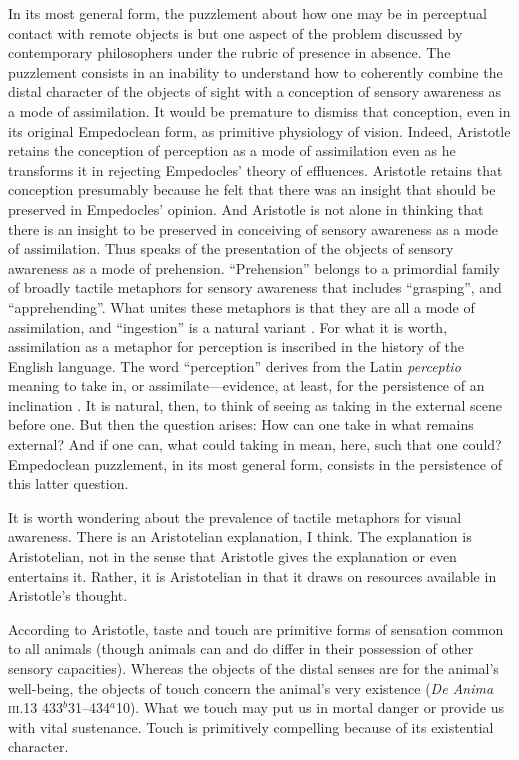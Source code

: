 In its most general form, the puzzlement about how one may be in perceptual contact with remote objects is but one aspect of the problem discussed by contemporary philosophers under the rubric of presence in absence. The puzzlement consists in an inability to understand how to coherently combine the distal character of the objects of sight with a conception of sensory awareness as a mode of assimilation. It would be premature to dismiss that conception, even in its original Empedoclean form, as primitive physiology of vision. Indeed, Aristotle retains the conception of perception as a mode of assimilation even as he transforms it in rejecting Empedocles' theory of effluences. Aristotle retains that conception presumably because he felt that there was an insight that should be preserved in Empedocles' opinion. And Aristotle is not alone in thinking that there is an insight to be preserved in conceiving of sensory awareness as a mode of assimilation. Thus \citet{Broad:1952kx} speaks of the presentation of the objects of sensory awareness as a mode of prehension.  ``Prehension'' belongs to a primordial family of broadly tactile metaphors for sensory awareness that includes ``grasping'', and ``apprehending''. What unites these metaphors is that they are all a mode of assimilation, and ``ingestion'' is a natural variant \citep[see][7]{Johnston:2006uq,Price:1932fk}. For what it is worth, assimilation as a metaphor for perception is inscribed in the history of the English language. The word ``perception'' derives from the Latin \emph{perceptio} meaning to take in, or assimilate---evidence, at least, for the persistence of an inclination \citep[102]{Burnyeat:1979mv}. It is natural, then, to think of seeing as taking in the external scene before one. But then the question arises: How can one take in what remains external? And if one can, what could taking in mean, here, such that one could? Empedoclean puzzlement, in its most general form, consists in the persistence of this latter question.

It is worth wondering about the prevalence of tactile metaphors for visual awareness. There is an Aristotelian explanation, I think. The explanation is Aristotelian, not in the sense that Aristotle gives the explanation or even entertains it. Rather, it is Aristotelian in that it draws on resources available in Aristotle's thought. 

According to Aristotle, taste and touch are primitive forms of sensation common to all animals (though animals can and do differ in their possession of other sensory capacities). Whereas the objects of the distal senses are for the animal's well-being, the objects of touch concern the animal's very existence (\emph{De Anima} \textsc{iii}.13 433\( ^{b} \)31--434\( ^{a} \)10). What we touch may put us in mortal danger or provide us with vital sustenance. Touch is primitively compelling because of its existential character.

